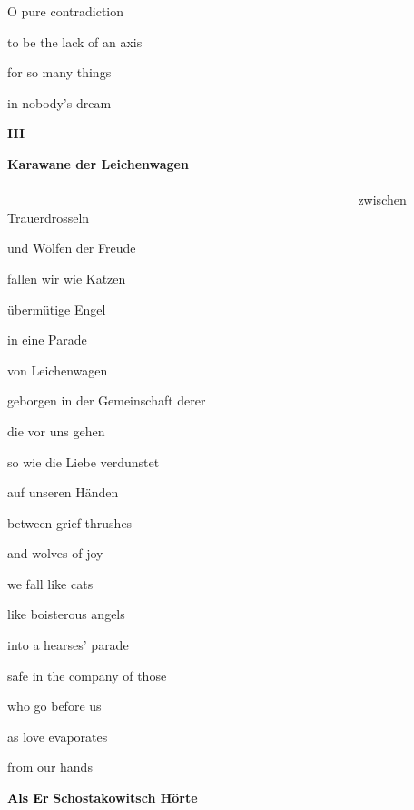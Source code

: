 \documentclass[a4paper]{article}
\begin{document}
O pure contradiction

to be the lack of an axis

for so many things

in nobody's dream

\clearpage
\bigskip

{\bfseries
III}

\clearpage
\textbf{Karawane der Leichenwagen
\ \ \ \ \ \ \ \ \ \ \ \ \ \ \ \ \ \ \ \ \ \ \ \ \ \ \ \ \ \ \ \ \ \ \ \ \ \ \ \ \ \ \ \ \ \ \ \ \ \ \ \ \ \ \ \ \ \ \ \ \ \ \ \ \ \ \ \ \ \ \ \ \ \ \ \ \ \ \ \ \ \ \ \ \ \ \ \ \ \ \ \ \ \ \ \ \ \ \ \ \ \ \ \ \ \ \ \ \ \ }zwischen
Trauerdrosseln

und Wölfen der Freude


\bigskip

fallen wir wie Katzen

übermütige Engel


\bigskip

in eine Parade

von Leichenwagen


\bigskip

geborgen in der Gemeinschaft derer

die vor uns gehen


\bigskip

so wie die Liebe verdunstet

auf unseren Händen


\bigskip



\bigskip

between grief thrushes

and wolves of joy


\bigskip

we fall like cats

like boisterous angels


\bigskip

into a hearses’ parade


\bigskip

safe in the company of those

who go before us


\bigskip

as love evaporates

from our hands


\bigskip

\clearpage
\textbf{\textcolor{black}{Als Er}} \textbf{Schostakowitsch Hörte}


\bigskip
\end{document}
